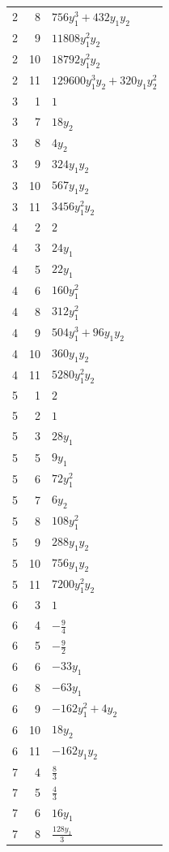 \documentclass[10pt,a4paper]{article}
\begin{document}
{\begin{longtable}{rrp{125mm}}
2 & 8 & $756 y_{1}^{3} + 432 y_{1} y_{2}$\\
2 & 9 & $11808 y_{1}^{2} y_{2}$\\
2 & 10 & $18792 y_{1}^{2} y_{2}$\\
2 & 11 & $129600 y_{1}^{3} y_{2} + 320 y_{1} y_{2}^{2}$\\
3 & 1 & $1$\\
3 & 7 & $18 y_{2}$\\
3 & 8 & $4 y_{2}$\\
3 & 9 & $324 y_{1} y_{2}$\\
3 & 10 & $567 y_{1} y_{2}$\\
3 & 11 & $3456 y_{1}^{2} y_{2}$\\
4 & 2 & $2$\\
4 & 3 & $24 y_{1}$\\
4 & 5 & $22 y_{1}$\\
4 & 6 & $160 y_{1}^{2}$\\
4 & 8 & $312 y_{1}^{2}$\\
4 & 9 & $504 y_{1}^{3} + 96 y_{1} y_{2}$\\
4 & 10 & $360 y_{1} y_{2}$\\
4 & 11 & $5280 y_{1}^{2} y_{2}$\\
5 & 1 & $2$\\
5 & 2 & $1$\\
5 & 3 & $28 y_{1}$\\
5 & 5 & $9 y_{1}$\\
5 & 6 & $72 y_{1}^{2}$\\
5 & 7 & $6 y_{2}$\\
5 & 8 & $108 y_{1}^{2}$\\
5 & 9 & $288 y_{1} y_{2}$\\
5 & 10 & $756 y_{1} y_{2}$\\
5 & 11 & $7200 y_{1}^{2} y_{2}$\\
6 & 3 & $1$\\
6 & 4 & $- \frac{9}{4}$\\
6 & 5 & $- \frac{9}{2}$\\
6 & 6 & $- 33 y_{1}$\\
6 & 8 & $- 63 y_{1}$\\
6 & 9 & $- 162 y_{1}^{2} + 4 y_{2}$\\
6 & 10 & $18 y_{2}$\\
6 & 11 & $- 162 y_{1} y_{2}$\\
7 & 4 & $\frac{8}{3}$\\
7 & 5 & $\frac{4}{3}$\\
7 & 6 & $16 y_{1}$\\
7 & 8 & $\frac{128 y_{1}}{3}$\\

\end{longtable}}
\end{document}
